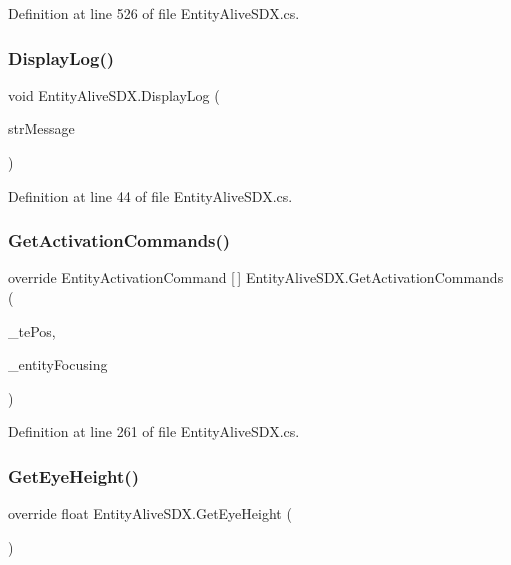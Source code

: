 Definition at line 526 of file Entity\+Alive\+S\+D\+X.\+cs.

\mbox{\label{class_entity_alive_s_d_x_a2454e38344f1472b1014c714ddb35363}} 
\subsubsection{\texorpdfstring{DisplayLog()}{DisplayLog()}}
{\footnotesize\ttfamily void Entity\+Alive\+S\+D\+X.\+Display\+Log (\begin{DoxyParamCaption}\item[{String}]{str\+Message }\end{DoxyParamCaption})}



Definition at line 44 of file Entity\+Alive\+S\+D\+X.\+cs.

\mbox{\label{class_entity_alive_s_d_x_a824f26d15c794d3935249af12e135de9}} 
\subsubsection{\texorpdfstring{GetActivationCommands()}{GetActivationCommands()}}
{\footnotesize\ttfamily override Entity\+Activation\+Command \mbox{[}$\,$\mbox{]} Entity\+Alive\+S\+D\+X.\+Get\+Activation\+Commands (\begin{DoxyParamCaption}\item[{Vector3i}]{\+\_\+te\+Pos,  }\item[{Entity\+Alive}]{\+\_\+entity\+Focusing }\end{DoxyParamCaption})}



Definition at line 261 of file Entity\+Alive\+S\+D\+X.\+cs.

\mbox{\label{class_entity_alive_s_d_x_a7bf3ec799d628a76677c72b5f9a6a6c3}} 
\subsubsection{\texorpdfstring{GetEyeHeight()}{GetEyeHeight()}}
{\footnotesize\ttfamily override float Entity\+Alive\+S\+D\+X.\+Get\+Eye\+Height (\begin{DoxyParamCaption}{ }\end{DoxyParamCaption})}




